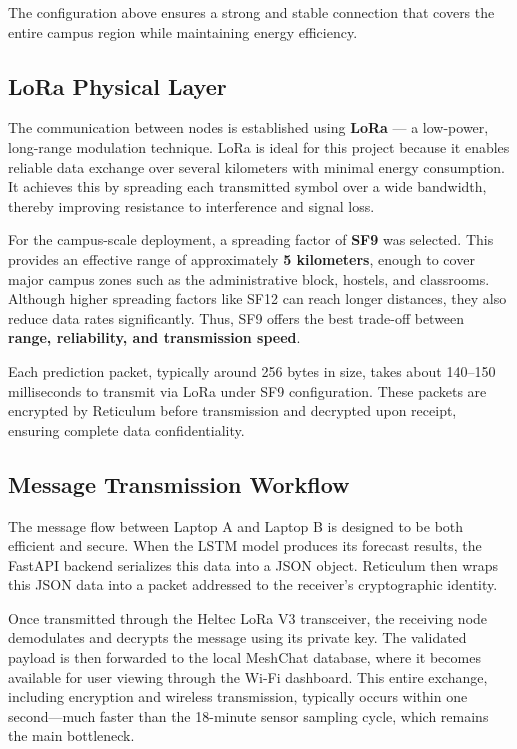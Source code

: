 The configuration above ensures a strong and stable connection that covers the entire campus region while maintaining energy efficiency.

\subsection{LoRa Physical Layer}

The communication between nodes is established using \textbf{LoRa} — a low-power, long-range modulation technique. LoRa is ideal for this project because it enables reliable data exchange over several kilometers with minimal energy consumption. It achieves this by spreading each transmitted symbol over a wide bandwidth, thereby improving resistance to interference and signal loss.

For the campus-scale deployment, a spreading factor of \textbf{SF9} was selected. This provides an effective range of approximately \textbf{5 kilometers}, enough to cover major campus zones such as the administrative block, hostels, and classrooms. Although higher spreading factors like SF12 can reach longer distances, they also reduce data rates significantly. Thus, SF9 offers the best trade-off between \textbf{range, reliability, and transmission speed}.

Each prediction packet, typically around 256 bytes in size, takes about 140–150 milliseconds to transmit via LoRa under SF9 configuration. These packets are encrypted by Reticulum before transmission and decrypted upon receipt, ensuring complete data confidentiality.

\subsection{Message Transmission Workflow}

The message flow between Laptop A and Laptop B is designed to be both efficient and secure. When the LSTM model produces its forecast results, the FastAPI backend serializes this data into a JSON object. Reticulum then wraps this JSON data into a packet addressed to the receiver’s cryptographic identity.

Once transmitted through the Heltec LoRa V3 transceiver, the receiving node demodulates and decrypts the message using its private key. The validated payload is then forwarded to the local MeshChat database, where it becomes available for user viewing through the Wi-Fi dashboard. This entire exchange, including encryption and wireless transmission, typically occurs within one second—much faster than the 18-minute sensor sampling cycle, which remains the main bottleneck.

